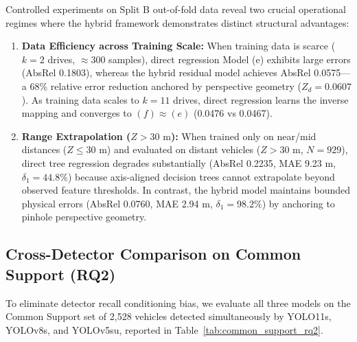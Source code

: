 \documentclass[]{spie}  %
\begin{document}
Controlled experiments on Split B out-of-fold data reveal two crucial operational regimes where the hybrid framework demonstrates distinct structural advantages:
\begin{enumerate}
    \item \textbf{Data Efficiency across Training Scale:} When training data is scarce ($k = 2$ drives, $\approx 300$ samples), direct regression Model (e) exhibits large errors (AbsRel 0.1803), whereas the hybrid residual model achieves AbsRel 0.0575---a 68\% relative error reduction anchored by perspective geometry ($Z_d = 0.0607$). As training data scales to $k = 11$ drives, direct regression learns the inverse mapping and converges to $(f) \approx (e)$ (0.0476 vs 0.0467).
    \item \textbf{Range Extrapolation ($Z > 30\text{ m}$):} When trained only on near/mid distances ($Z \le 30\text{ m}$) and evaluated on distant vehicles ($Z > 30\text{ m}$, $N = 929$), direct tree regression degrades substantially (AbsRel 0.2235, MAE 9.23 m, $\delta_1 = 44.8\%$) because axis-aligned decision trees cannot extrapolate beyond observed feature thresholds. In contrast, the hybrid model maintains bounded physical errors (AbsRel 0.0760, MAE 2.94 m, $\delta_1 = 98.2\%$) by anchoring to pinhole perspective geometry.
\end{enumerate}

\subsection{Cross-Detector Comparison on Common Support (RQ2)}
To eliminate detector recall conditioning bias, we evaluate all three models on the Common Support set of 2,528 vehicles detected simultaneously by YOLO11s, YOLOv8s, and YOLOv5su, reported in Table~\ref{tab:common_support_rq2}.
\end{document}
